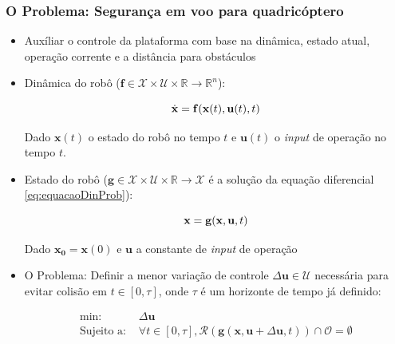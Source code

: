 \documentclass{beamer}
\begin{document}
\begin{frame}[allowframebreaks]
	\frametitle{O Problema: Segurança em voo para quadricóptero}
	
	\begin{itemize}
		
		\item Auxíliar o controle da plataforma com base na dinâmica, estado  atual, operação corrente e a distância para obstáculos
		
		\item Dinâmica do robô ($\mathbf{f} \in \mathcal{X} \times \mathcal{U} \times \mathbb{R} \rightarrow \mathbb{R}^{n}$):
		
		\begin{equation}
		\centering
		\dot{\mathbf{x}} = \mathbf{f}(\mathbf{x}(t),\mathbf{u}(t),t)  
		\label{eq:equacaoDinProb}
		\end{equation}
		
		
		Dado $\mathbf{x}(t)$ o estado do robô no tempo $t$ e $\mathbf{u}(t)$ o \textit{input} de operação no tempo $t$.
		
		
		
		\item Estado do robô ($\mathbf{g} \in \mathcal{X} \times \mathcal{U} \times \mathbb{R} \rightarrow \mathcal{X}$ é a solução da equação diferencial \ref{eq:equacaoDinProb}):
		
		\begin{equation}
		\centering
		\mathbf{x} = \mathbf{g}(\mathbf{x},\mathbf{u},t)  
		\label{eq:equacaoPosProb}
		\end{equation}
	
		Dado $\mathbf{x_0} = \mathbf{x}(0)$ e $\mathbf{u}$ a constante de \textit{input} de operação				
		
	\framebreak
	
		
		\item O Problema: Definir a menor variação de controle $\Delta\mathbf{u} \in \mathcal{U}$ necessária para evitar colisão em $t \in [0,\tau]$, onde $\tau$ é um horizonte de tempo já definido:
		
		\begin{equation}
		\begin{aligned}
		\text{min: }& \Delta\mathbf{u} \\
		\text{Sujeito a: }& \forall t \in [0,\tau], \mathcal{R}(\mathbf{g}(\mathbf{x}, \mathbf{u}+\Delta\mathbf{u}, t)) \cap \mathcal{O} = \emptyset
		\end{aligned}
		\label{eq:equacaoProb}
		\end{equation}
		

\end{itemize}
\end{frame}
\end{document}

